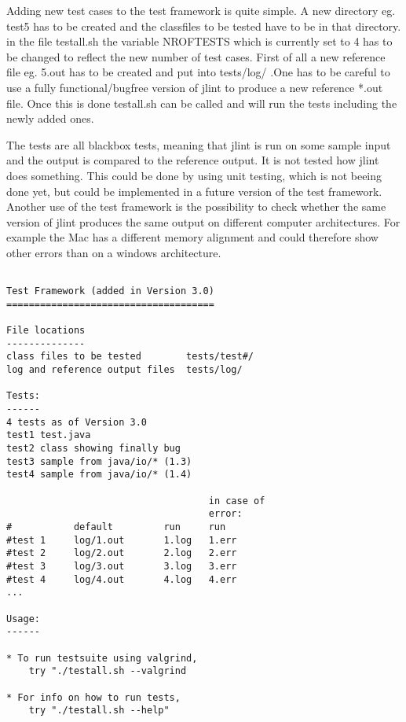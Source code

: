 \documentclass[11pt,twoside,a4paper,draft]{article}
\begin{document}
Adding new test cases to the test framework is quite simple. A new directory eg. test5 has to be created and the classfiles to be tested have to be in that directory. in the file testall.sh the variable NROFTESTS which is currently set to 4 has to be changed to reflect the new number of test cases. First of all a new reference file eg. 5.out has to be created and put into tests/log/ .One has to be careful to use a fully functional/bugfree version of jlint to produce a new reference *.out file. Once this is done testall.sh can be called and will run the tests including the newly added ones.

The tests are all blackbox tests, meaning that jlint is run on some sample input and the output is compared to the reference output. It is not tested how jlint does something. This could be done by using unit testing, which is not beeing done yet, but could be implemented in a future version of the test framework.
Another use of the test framework is the possibility to check whether the same version of jlint produces the same output on different computer architectures. For example the Mac has a different memory alignment and could therefore show other errors than on a windows architecture.



\begin{verbatim}

Test Framework (added in Version 3.0)
=====================================

File locations
--------------
class files to be tested        tests/test#/
log and reference output files  tests/log/

Tests:
------
4 tests as of Version 3.0
test1 test.java
test2 class showing finally bug
test3 sample from java/io/* (1.3)
test4 sample from java/io/* (1.4)

                                    in case of
                                    error:
#           default         run     run
#test 1     log/1.out       1.log   1.err
#test 2     log/2.out       2.log   2.err
#test 3     log/3.out       3.log   3.err
#test 4     log/4.out       4.log   4.err
...

Usage:
------

* To run testsuite using valgrind, 
	try "./testall.sh --valgrind

* For info on how to run tests, 
	try "./testall.sh --help"

\end{verbatim}
\end{document}

